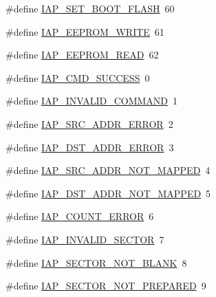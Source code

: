 \begin{DoxyCompactItemize}
\item 
\#define \hyperlink{group___i_a_p__18_x_x__43_x_x_ga4646ad8175c6335281e56f3d0e6e63f9}{I\+A\+P\+\_\+\+S\+E\+T\+\_\+\+B\+O\+O\+T\+\_\+\+F\+L\+A\+SH}~60
\item 
\#define \hyperlink{group___i_a_p__18_x_x__43_x_x_ga76ebaaa7cd2a015246d1a44e3a0cc369}{I\+A\+P\+\_\+\+E\+E\+P\+R\+O\+M\+\_\+\+W\+R\+I\+TE}~61
\item 
\#define \hyperlink{group___i_a_p__18_x_x__43_x_x_ga34d721b0a3ff4caf7b847c9d85fe73a0}{I\+A\+P\+\_\+\+E\+E\+P\+R\+O\+M\+\_\+\+R\+E\+AD}~62
\item 
\#define \hyperlink{group___i_a_p__18_x_x__43_x_x_ga6855b3bb97689d746eff1f27dde58fc5}{I\+A\+P\+\_\+\+C\+M\+D\+\_\+\+S\+U\+C\+C\+E\+SS}~0
\item 
\#define \hyperlink{group___i_a_p__18_x_x__43_x_x_ga78fcc8d4b3835576a272431915e39eb7}{I\+A\+P\+\_\+\+I\+N\+V\+A\+L\+I\+D\+\_\+\+C\+O\+M\+M\+A\+ND}~1
\item 
\#define \hyperlink{group___i_a_p__18_x_x__43_x_x_gaad19f900fbc28ee51d3e0138a88a446b}{I\+A\+P\+\_\+\+S\+R\+C\+\_\+\+A\+D\+D\+R\+\_\+\+E\+R\+R\+OR}~2
\item 
\#define \hyperlink{group___i_a_p__18_x_x__43_x_x_ga72a13c4c7132aa3da476fc0907cb2a08}{I\+A\+P\+\_\+\+D\+S\+T\+\_\+\+A\+D\+D\+R\+\_\+\+E\+R\+R\+OR}~3
\item 
\#define \hyperlink{group___i_a_p__18_x_x__43_x_x_ga8d15cbc501933748afbe786c587e74f9}{I\+A\+P\+\_\+\+S\+R\+C\+\_\+\+A\+D\+D\+R\+\_\+\+N\+O\+T\+\_\+\+M\+A\+P\+P\+ED}~4
\item 
\#define \hyperlink{group___i_a_p__18_x_x__43_x_x_gacd5a7fb6c783f5d435e594170757d1d4}{I\+A\+P\+\_\+\+D\+S\+T\+\_\+\+A\+D\+D\+R\+\_\+\+N\+O\+T\+\_\+\+M\+A\+P\+P\+ED}~5
\item 
\#define \hyperlink{group___i_a_p__18_x_x__43_x_x_ga719488ff2abf2f325b73a10b20403813}{I\+A\+P\+\_\+\+C\+O\+U\+N\+T\+\_\+\+E\+R\+R\+OR}~6
\item 
\#define \hyperlink{group___i_a_p__18_x_x__43_x_x_gab3af925b968fb59823d08d77261aebf7}{I\+A\+P\+\_\+\+I\+N\+V\+A\+L\+I\+D\+\_\+\+S\+E\+C\+T\+OR}~7
\item 
\#define \hyperlink{group___i_a_p__18_x_x__43_x_x_ga19b046ec9c03aa0276a9cbe409eb3f04}{I\+A\+P\+\_\+\+S\+E\+C\+T\+O\+R\+\_\+\+N\+O\+T\+\_\+\+B\+L\+A\+NK}~8
\item 
\#define \hyperlink{group___i_a_p__18_x_x__43_x_x_ga8600f9e930f1dee5d67a2bc11efcde63}{I\+A\+P\+\_\+\+S\+E\+C\+T\+O\+R\+\_\+\+N\+O\+T\+\_\+\+P\+R\+E\+P\+A\+R\+ED}~9
\item 

\end{DoxyCompactItemize}
